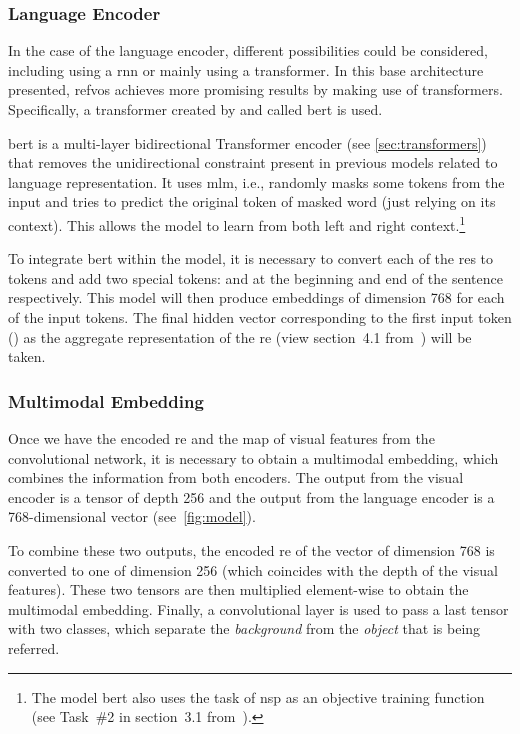 \subsubsection{Language Encoder}

In the case of the language encoder, different possibilities could be
considered, including using a \gls{rnn} or mainly using a transformer. In this
base architecture presented, \gls{refvos} achieves more promising results by
making use of transformers. Specifically, a transformer created by
 and called \gls{bert} is used.

\gls{bert} is a multi-layer bidirectional Transformer encoder (see
\vref{sec:transformers}) that removes the unidirectional constraint present in
previous models related to language representation. It uses \gls{mlm}, i.e.,
randomly masks some tokens from the input and tries to predict the original
token of masked word (just relying on its context). This allows the model to
learn from both left and right context.\footnote{The model \gls{bert} also uses
  the task of \gls{nsp} as an objective training function (see Task~\#{}2 in
  section~3.1 from~\cite{devlin19:bert}).}

To integrate \gls{bert} within the model, it is necessary to convert each of
the \glspl{re} to tokens and add two special tokens: \code{[CLS]} and
\code{[SEP]} at the beginning and end of the sentence respectively. This model
will then produce embeddings of dimension 768 for each of the input tokens. The
final hidden vector corresponding to the first input token (\code{[CLS]}) as
the aggregate representation of the \gls{re} (view section~4.1
from~\cite{devlin19:bert}) will be taken.

\subsubsection{Multimodal Embedding}

Once we have the encoded \gls{re} and the map of visual features from the
convolutional network, it is necessary to obtain a multimodal embedding, which
combines the information from both encoders. The output from the visual encoder
is a tensor of depth 256 and the output from the language encoder is a
768-dimensional vector (see\ \vref{fig:model}).

To combine these two outputs, the encoded \gls{re} of the vector of dimension
768 is converted to one of dimension 256 (which coincides with the depth of the
visual features). These two tensors are then multiplied element-wise to obtain
the multimodal embedding. Finally, a convolutional layer is used to pass a last
tensor with two classes, which separate the \emph{background} from the
\emph{object} that is being referred.


